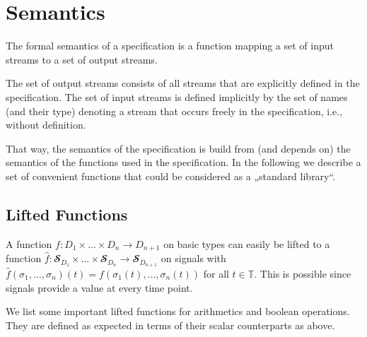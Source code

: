 \section{Semantics}

The formal semantics of a \tessla specification is a function mapping a set of input streams to a set of output streams.

The set of output streams consists of all streams that are explicitly defined in the specification.
The set of input streams is defined implicitly by the set of names (and their type) denoting a stream that occurs freely in the specification, i.e., without definition.

That way, the semantics of the specification is build from (and depends on) the semantics of the functions used in the specification.
In the following we describe a set of convenient functions that could be considered as a „standard library“.

\subsection{Lifted Functions}

A function $f: D_1 × … × D_n → D_{n+1}$ on basic types can easily be lifted to a function $\hat{f}: 𝓢_{D_1} × … × 𝓢_{D_n} → 𝓢_{D_{n+1}}$ on signals with $\hat{f}(σ_1,…,σ_n)(t) = f(σ_1(t),…,σ_n(t))$ for all $t∈𝕋$.
This is possible since signals provide a value at every time point. 

We list some important lifted functions for arithmetics and boolean operations. 
They are defined as expected in terms of their scalar counterparts as above.

